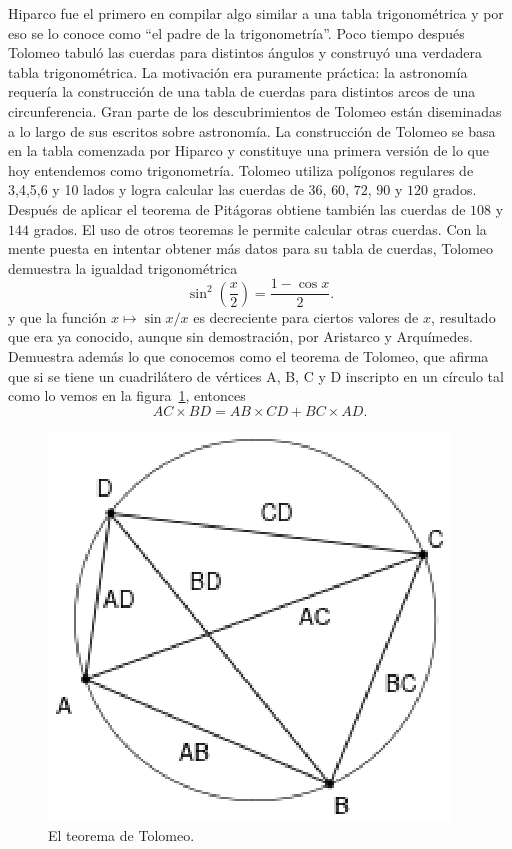 Hiparco fue el primero en compilar algo similar a una tabla trigonométrica y
por eso se lo conoce como ``el padre de la trigonometría''.  Poco tiempo
después Tolomeo tabuló las cuerdas para distintos ángulos y construyó una
verdadera tabla trigonométrica. La motivación era puramente práctica: la
astronomía requería la construcción de una tabla de cuerdas para distintos
arcos de una circunferencia. Gran parte de los descubrimientos de Tolomeo están
diseminadas a lo largo de sus escritos sobre astronomía.  La construcción de
Tolomeo se basa en la tabla comenzada por Hiparco y constituye una primera
versión de lo que hoy entendemos como trigonometría. Tolomeo utiliza polígonos
regulares de 3,4,5,6 y 10 lados y logra calcular las cuerdas de $36$, $60$,
$72$, $90$ y $120$ grados. Después de aplicar el teorema de Pitágoras obtiene
también las cuerdas de $108$ y $144$ grados. El uso de otros teoremas le
permite calcular otras cuerdas. Con la mente puesta en intentar obtener más
datos para su tabla de cuerdas, Tolomeo demuestra 
la igualdad trigonométrica 
\[
	\sin^2\left(\frac{x}{2}\right)=\frac{1-\cos x}{2}.
\]
y que la función $x\mapsto \sin x/x$ 
es decreciente para ciertos valores de $x$, resultado que era ya conocido,
aunque sin demostración, por Aristarco y Arquímedes.  Demuestra además lo que
conocemos como el teorema de Tolomeo, que afirma que si se tiene un
cuadrilátero de vértices A, B, C y D inscripto en un círculo tal como lo vemos
en la figura~\ref{fig:Tolomeo}, entonces
\[
	AC\times BD=AB\times CD+BC\times AD.
\]

\begin{figure}[h]
   \centering
   \includegraphics[scale=0.6]{images/tolomeo}
   \caption{El teorema de Tolomeo.}
   \label{fig:Tolomeo}
\end{figure}

